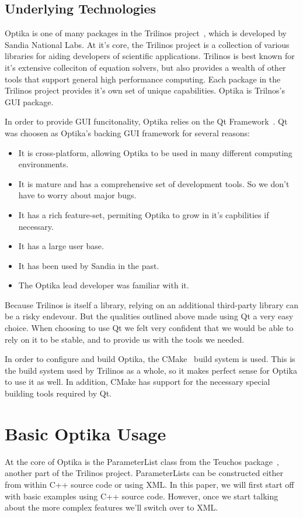 \subsection{Underlying Technologies}
Optika is one of many packages in the Trilinos project~\cite{trilinos}, which is developed by Sandia National Labs. At it's core, 
the Trilinos project is a collection of various
libraries for aiding developers of scientific applications. Trilinos is best known for it's extensive colleciton of equation solvers,
but also provides a wealth of other tools that support general high performance computing. Each package in the Trilinos project provides
it's own set of unique capabilities. Optika is Trilnos's GUI package.

In order to provide GUI funcitonality, Optika relies on the Qt Framework~\cite{Qt}. 
Qt was choosen as Optika's backing GUI framework for several
reasons:
	\begin{itemize}
		\item It is cross-platform, allowing Optika to be used in many different computing environments.
		\item It is mature and has a comprehensive set of development tools. So we don't have to worry about major bugs.
		\item It has a rich feature-set, permiting Optika to grow in it's capbilities if necessary.
    \item It has a large user base.
		\item It has been used by Sandia in the past.
		\item The Optika lead developer was familiar with it.
	\end{itemize}
Because Trilinos is itself a library, relying on an additional third-party library can be a risky endevour. But
the qualities outlined above made using Qt a very easy choice. When choosing to use Qt we felt very confident that we 
would be able to rely on it to be stable, and to provide us with the tools we needed.

In order to configure and build Optika, the CMake~\cite{cmake} build system is used. This is the build system
used by Trilinos as a whole, so it makes perfect sense for Optika to use it as well. In addition, CMake
has support for the necessary special building tools required by Qt.

\section{Basic Optika Usage}
At the core of Optika is the ParameterList class from the Teuchos package~\cite{TeuchosPackage}, another part
of the Trilinos project. ParameterLists can be constructed either from within C++ source code or using XML.
In this paper, we will first start off with basic examples using C++ source code. However, once we start
talking about the more complex features we'll switch over to XML.
